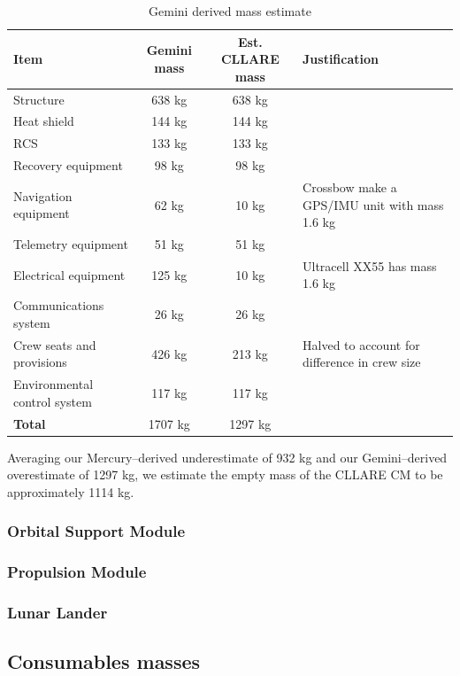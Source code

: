 \documentclass{report}
\begin{document}
\begin{table}
\centering
\begin{tabular}{|l|c|c|l|}
\hline
Item	& Gemini mass & Est. CLLARE mass & Justification \\
\hline \hline
Structure		& 638 kg	& 638 kg &  \\
Heat shield		& 144 kg	& 144 kg & \\
RCS			& 133 kg	& 133 kg & \\
Recovery equipment	& 98 kg		& 98 kg & \\
Navigation equipment	& 62 kg		& 10 kg & Crossbow make a GPS/IMU unit with mass 1.6 kg \\
Telemetry equipment	& 51 kg		& 51 kg & \\
Electrical equipment	& 125 kg		& 10 kg & Ultracell XX55 has mass 1.6 kg \\
Communications system	& 26 kg		& 26 kg & \\
Crew seats and provisions & 426 kg	& 213 kg & Halved to account for difference in crew size \\
Environmental control system	&  117 kg		& 117 kg & \\
\hline \hline
\textbf{Total}	& 1707 kg & 1297 kg	& \\
\hline
\end{tabular}
\caption{Gemini derived mass estimate}
\label{tab:geminimass}
\end{table} 

Averaging our Mercury--derived underestimate of 932 kg and our Gemini--derived overestimate of 1297 kg, we estimate the empty mass of the CLLARE CM to be approximately 1114 kg.

\subsubsection{Orbital Support Module}

\subsubsection{Propulsion Module}

\subsubsection{Lunar Lander}

\subsection{Consumables masses}
\end{document}
